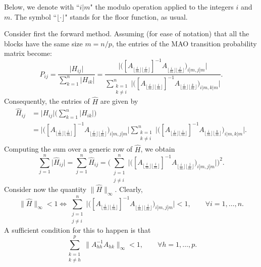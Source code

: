 \documentclass[final,leqno,onefignum,onetabnum]{siamltex1213}
\begin{document}
Below, we denote with ``$i|m$" the
modulo operation applied to the integers $i$ and $m$. The
symbol ``$\lfloor \cdot \rfloor$" stands for the floor function, as usual.

Consider first the forward method. Assuming (for ease of notation)
that all the blocks have the same size $m=n/p$,
the entries of the MAO transition probability matrix become:
\[
 P_{ij}=\frac{\lvert H_{ij} \rvert}{\sum_{k=1}^n\lvert H_{ik}
\rvert}=\frac{\bigg \lvert \bigg ([A_{\lfloor
\frac{i}{m}\rfloor \lfloor
\frac{i}{m}\rfloor}]^{-1} A_{\lfloor \frac{i}{m}\rfloor \lfloor
\frac{j}{m}\rfloor}\bigg )_{i|m,j|m}\bigg
\rvert}{\displaystyle \sum_{\substack{k=1\\k\ne i}}^n\bigg \lvert \bigg
([A_{\lfloor
\frac{i}{m}\rfloor \lfloor
\frac{i}{m}\rfloor}]^{-1} A_{\lfloor \frac{i}{m}\rfloor \lfloor
\frac{k}{m}\rfloor}\bigg )_{i|m,k|m}\bigg \rvert}.
\]
Consequently, the entries of $\hat{H}$ are given by
\[
\begin{array}{rl}
\hat{H}_{ij} & = \lvert H_{ij}\rvert\bigg(\sum_{k=1}^n\lvert H_{ik}\rvert\bigg)\\
& =
\bigg \lvert \bigg ([A_{\lfloor \frac{i}{m}\rfloor \lfloor
\frac{i}{m}\rfloor}]^{-1} A_{\lfloor \frac{i}{m}\rfloor \lfloor
\frac{j}{m}\rfloor}\bigg )_{i|m,j|m}\bigg
\rvert
{\displaystyle
\sum_{\substack{k=1\\k\ne i}}^n\bigg \lvert \bigg ([A_{\lfloor
\frac{i}{m}\rfloor \lfloor
\frac{i}{m}\rfloor}]^{-1} A_{\lfloor \frac{i}{m}\rfloor \lfloor
\frac{k}{m}\rfloor}\bigg )_{i|m,k|m}\bigg \rvert.
}
\end{array}
\]
Computing the sum over a generic row of $\hat{H}$, we obtain
\[
 \sum_{j=1}^n \lvert \hat{H}_{ij}\rvert=\sum_{j=1}^n \hat{H}_{ij} =
 \bigg ( \sum_{\substack{j=1\\j\ne i}}^n\bigg \lvert \bigg ([A_{\lfloor
\frac{i}{m}\rfloor \lfloor
\frac{i}{m}\rfloor}]^{-1} A_{\lfloor \frac{i}{m}\rfloor \lfloor
\frac{j}{m}\rfloor}\bigg )_{i|m,j|m}\bigg \rvert \bigg ) ^2.
\]
Consider now the quantity $\lVert \hat{H}\rVert_{\infty}$. Clearly,
\[
 \lVert \hat{H}\rVert_{\infty}<1 \Leftrightarrow \sum_{\substack{j=1\\j\ne
i}}^n\bigg \lvert \bigg ([A_{\lfloor
\frac{i}{m}\rfloor \lfloor
\frac{i}{m}\rfloor}]^{-1} A_{\lfloor \frac{i}{m}\rfloor \lfloor
\frac{j}{m}\rfloor}\bigg )_{i|m,j|m}\bigg \rvert <1, \qquad \forall
i=1,\ldots,n.
\]
 A sufficient condition for this to happen is that
 \begin{equation}
  \sum_{\substack{k=1\\k\ne h}}^p \lVert A_{hh}^{-1}A_{hk}\rVert_{\infty}<1,
    \label{block_cs}\qquad \forall h=1,\ldots,p.
 \end{equation}
\end{document}
